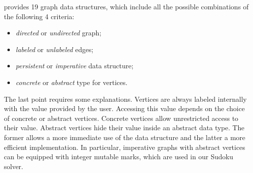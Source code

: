 \ocamlgraph provides 19 graph data structures, which include all the
possible combinations of the following 4 criteria:
\begin{itemize}
\item \emph{directed} or \emph{undirected} graph;
\item \emph{labeled} or \emph{unlabeled} edges;
\item \emph{persistent} or \emph{imperative} data structure;
\item \emph{concrete} or \emph{abstract} type for vertices.
\end{itemize}
The last point requires some explanations. Vertices are always labeled
internally with the value provided by the user. Accessing this value
depends on the choice of concrete or abstract vertices.  Concrete
vertices allow unrestricted access to their value.  Abstract vertices
hide their value inside an abstract data type.  The former allows a
more immediate use of the data structure and the latter a more
efficient implementation. In particular, imperative graphs with
abstract vertices can be equipped with integer mutable marks, which
are used in our Sudoku solver.

